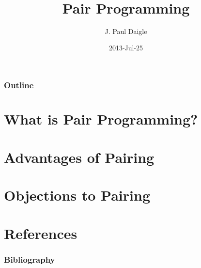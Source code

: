 

\title[] %
{Pair Programming}

\subtitle
{} %

\author[] %
{J. Paul Daigle }



\date[] %
{2013-Jul-25}

\subject{}














\begin{frame}
  \titlepage
\end{frame}

\begin{frame}
  \frametitle{Outline}
  \tableofcontents
\end{frame}


\section{What is Pair Programming?}

\section{Advantages of Pairing}

\section{Objections to Pairing}

\section{References}
\begin{frame}[allowframebreaks]
  \frametitle{Bibliography}
  
\end{frame}



